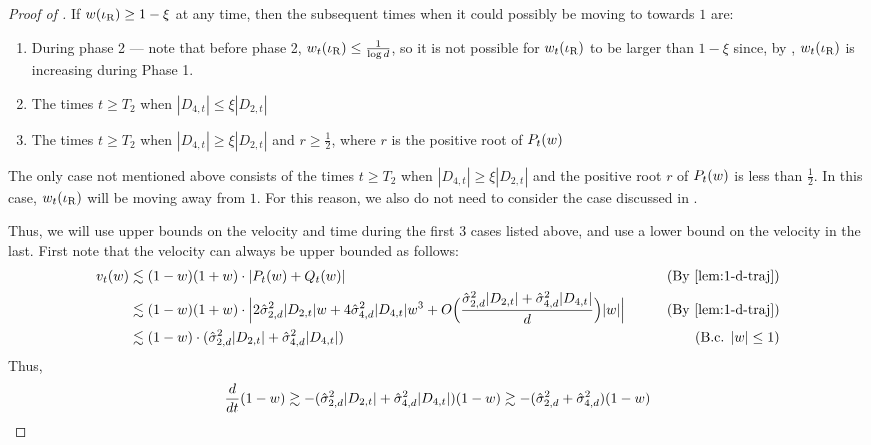 \begin{proof}[Proof of ]
If $w(\iota_{\textup{R}}) \geq 1 - \xi$ at any time, then the subsequent times when it could possibly be moving to towards $1$ are:
\begin{enumerate}
    \item During phase 2 --- note that before phase 2, $w_t(\iota_{\textup{R}}) \leq \frac{1}{\log d}$, so it is not possible for $w_t(\iota_{\textup{R}})$ to be larger than $1 - \xi$ since, by , $w_t(\iota_{\textup{R}})$ is increasing during Phase 1.
    \item The times $t \geq T_2$ when $|D_{4, t}| \leq \xi |D_{2, t}|$
    \item The times $t \geq T_2$ when $|D_{4, t}| \geq \xi |D_{2, t}|$ and $r \geq \frac{1}{2}$, where $r$ is the positive root of $P_t(w)$
\end{enumerate}

The only case not mentioned above consists of the times $t \geq T_2$ when $|D_{4, t}| \geq \xi |D_{2, t}|$ and the positive root $r$ of $P_t(w)$ is less than $\frac{1}{2}$. In this case, $w_t(\iota_{\textup{R}})$ will be moving away from $1$. For this reason, we also do not need to consider the case discussed in .

Thus, we will use upper bounds on the velocity and time during the first 3 cases listed above, and use a lower bound on the velocity in the last. First note that the velocity can always be upper bounded as follows:
\begin{align}
\vel_t(\w)
& \lesssim (1 - \w) (1 + \w) \cdot |P_t(\w) + Q_t(\w)| 
& \tag{By \Cref{lem:1-d-traj}} \\
& \lesssim (1 - \w) (1 + \w) \cdot \Big| 2 \sigmaCoeffTwo^2 |D_{2, t}| \w + 4 \sigmaCoeffFour^2 |D_{4, t}| \w^3 + O\Big(\frac{\sigmaCoeffTwo^2 |D_{2, t}| + \sigmaCoeffFour^2 |D_{4, t}|}{d}\Big) |\w| \Big|
& \tag{By \Cref{lem:1-d-traj}} \\
& \lesssim (1 - \w) \cdot (\sigmaCoeffTwo^2 |D_{2, t}| + \sigmaCoeffFour^2 |D_{4, t}|)
& \tag{B.c. $|\w| \leq 1$}
\end{align}
Thus,
\begin{align} \label{eq:growth_at_1_UB}
\frac{d}{dt} (1 - w)
 \gtrsim -(\hat{\sigma}_{2, d}^2 |D_{2, t}| + \hat{\sigma}_{4, d}^2 |D_{4, t}|) (1 - w) 
 \gtrsim -(\hat{\sigma}_{2, d}^2 + \hat{\sigma}_{4, d}^2) (1 - w)
\end{align}


\end{proof}
